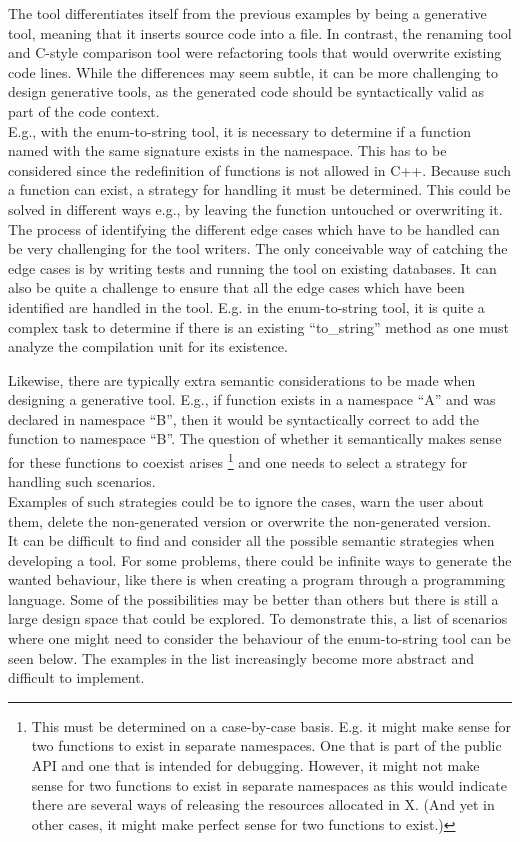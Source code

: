 The tool differentiates itself from the previous examples by being a generative tool, meaning that it inserts source code into a file.
In contrast, the renaming tool and C-style comparison tool were refactoring tools that would overwrite existing code lines.
While the differences may seem subtle, it can be more challenging to design generative tools, as the generated code should be syntactically valid as part of the code context.\\
E.g., with the enum-to-string tool, it is necessary to determine if a function named  with the same signature exists in the namespace. This has to be considered since the redefinition of functions is not allowed in C++.
Because such a function can exist, a strategy for handling it must be determined. This could be solved in different ways e.g., by leaving the function untouched or overwriting it. The process of identifying the different edge cases which have to be handled can be very challenging for the tool writers. The only conceivable way of catching the edge cases is by writing tests and running the tool on existing databases. 
It can also be quite a challenge to ensure that all the edge cases which have been identified are handled in the tool. E.g. in the enum-to-string tool, it is quite a complex task to determine if there is an existing ``to\_string'' method as one must analyze the compilation unit for its existence.

Likewise, there are typically extra semantic considerations to be made when designing a generative tool. E.g., if  function exists in a namespace ``A'' and  was declared in namespace ``B'', then it would be syntactically correct to add the  function to namespace ``B''. The question of whether it semantically makes sense for these functions to coexist arises
\footnote{This must be determined on a case-by-case basis. E.g. it might make sense for two  functions to exist in separate namespaces. One that is part of the public API and one that is intended for debugging. However, it might not make sense for two  functions to exist in separate namespaces as this would indicate there are several ways of releasing the resources allocated in X. (And yet in other cases, it might make perfect sense for two  functions to exist.)}
and one needs to select a strategy for handling such scenarios.\\
Examples of such strategies could be to ignore the cases, warn the user about them, delete the non-generated version or overwrite the non-generated version.\\
It can be difficult to find and consider all the possible semantic strategies when developing a tool. For some problems, there could be infinite ways to generate the wanted behaviour, like there is when creating a program through a programming language. Some of the possibilities may be better than others but there is still a large design space that could be explored.
To demonstrate this, a list of scenarios where one might need to consider the behaviour of the enum-to-string tool can be seen below. The examples in the list increasingly become more abstract and difficult to implement.


